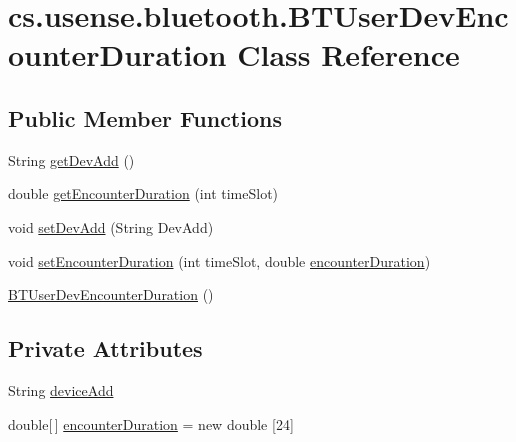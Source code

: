 \hypertarget{classcs_1_1usense_1_1bluetooth_1_1_b_t_user_dev_encounter_duration}{}\section{cs.\+usense.\+bluetooth.\+B\+T\+User\+Dev\+Encounter\+Duration Class Reference}
\label{classcs_1_1usense_1_1bluetooth_1_1_b_t_user_dev_encounter_duration}
\subsection*{Public Member Functions}
\begin{DoxyCompactItemize}
\item 
String \hyperlink{classcs_1_1usense_1_1bluetooth_1_1_b_t_user_dev_encounter_duration_ad8a5f4cac2e1c149487e675b988ea5c5}{get\+Dev\+Add} ()
\item 
double \hyperlink{classcs_1_1usense_1_1bluetooth_1_1_b_t_user_dev_encounter_duration_a153b188f50b4614328a060e8829b06ad}{get\+Encounter\+Duration} (int time\+Slot)
\item 
void \hyperlink{classcs_1_1usense_1_1bluetooth_1_1_b_t_user_dev_encounter_duration_aa09fcde6664698a8e98bae5a8f562ef8}{set\+Dev\+Add} (String Dev\+Add)
\item 
void \hyperlink{classcs_1_1usense_1_1bluetooth_1_1_b_t_user_dev_encounter_duration_a4ba4c7b9519d6ee48803d0bf55d09645}{set\+Encounter\+Duration} (int time\+Slot, double \hyperlink{classcs_1_1usense_1_1bluetooth_1_1_b_t_user_dev_encounter_duration_a759c1959a43fb0d4832ef0dd224f0379}{encounter\+Duration})
\item 
\hyperlink{classcs_1_1usense_1_1bluetooth_1_1_b_t_user_dev_encounter_duration_a479d93f56dba71dcd5b401f4f65cf372}{B\+T\+User\+Dev\+Encounter\+Duration} ()
\end{DoxyCompactItemize}
\subsection*{Private Attributes}
\begin{DoxyCompactItemize}
\item 
String \hyperlink{classcs_1_1usense_1_1bluetooth_1_1_b_t_user_dev_encounter_duration_a57b2b34eda36119c23efe3d0170bc569}{device\+Add}
\item 
double\mbox{[}$\,$\mbox{]} \hyperlink{classcs_1_1usense_1_1bluetooth_1_1_b_t_user_dev_encounter_duration_a759c1959a43fb0d4832ef0dd224f0379}{encounter\+Duration} = new double \mbox{[}24\mbox{]}
\end{DoxyCompactItemize}


